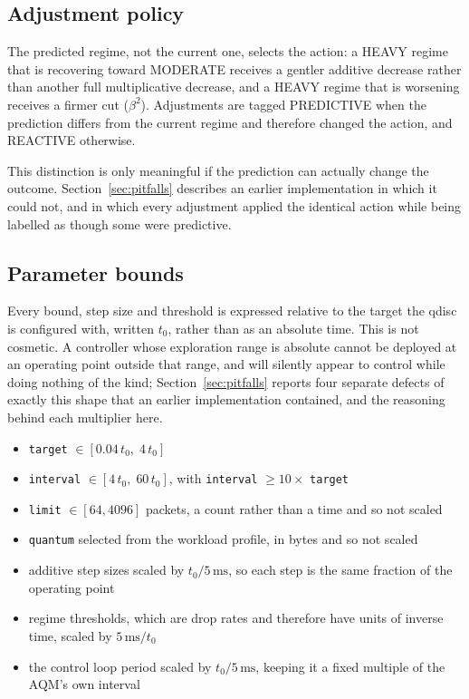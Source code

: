 \documentclass[conference]{IEEEtran}
\begin{document}
\subsection{Adjustment policy}

The predicted regime, not the current one, selects the action: a HEAVY regime
that is recovering toward MODERATE receives a gentler additive decrease rather
than another full multiplicative decrease, and a HEAVY regime that is worsening
receives a firmer cut ($\beta^2$). Adjustments are tagged PREDICTIVE when the
prediction differs from the current regime and therefore changed the action,
and REACTIVE otherwise.

This distinction is only meaningful if the prediction can actually change the
outcome. Section~\ref{sec:pitfalls} describes an earlier implementation in
which it could not, and in which every adjustment applied the identical action
while being labelled as though some were predictive.

\subsection{Parameter bounds}
\label{sec:bounds}

Every bound, step size and threshold is expressed relative to the target the
qdisc is configured with, written $t_0$, rather than as an absolute time. This
is not cosmetic. A controller whose exploration range is absolute cannot be
deployed at an operating point outside that range, and will silently appear to
control while doing nothing of the kind;
Section~\ref{sec:pitfalls} reports four separate defects of exactly this shape
that an earlier implementation contained, and the reasoning behind each
multiplier here.

\begin{itemize}
\item \texttt{target} $\in [0.04\,t_0,\; 4\,t_0]$
\item \texttt{interval} $\in [4\,t_0,\; 60\,t_0]$, with
      \texttt{interval} $\ge 10 \times$ \texttt{target}
\item \texttt{limit} $\in [64, 4096]$ packets, a count rather than a time and
      so not scaled
\item \texttt{quantum} selected from the workload profile, in bytes and so not
      scaled
\item additive step sizes scaled by $t_0 / 5\,\mathrm{ms}$, so each step is the
      same fraction of the operating point
\item regime thresholds, which are drop rates and therefore have units of
      inverse time, scaled by $5\,\mathrm{ms} / t_0$
\item the control loop period scaled by $t_0 / 5\,\mathrm{ms}$, keeping it a
      fixed multiple of the AQM's own interval
\end{itemize}
\end{document}
